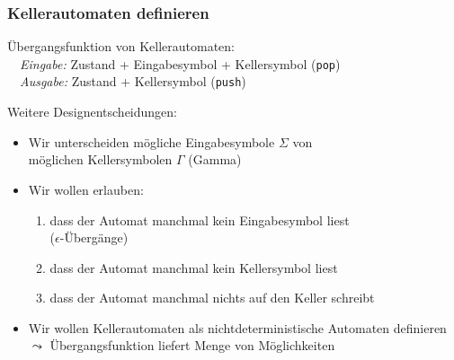\documentclass[aspectratio=1610,onlymath]{beamer}
\begin{document}
\begin{frame}\frametitle{Kellerautomaten definieren}

\alert{Übergangsfunktion von Kellerautomaten:}\\
~~\emph{Eingabe:} Zustand + Eingabesymbol + Kellersymbol (\texttt{pop})\\
~~\emph{Ausgabe:} Zustand + Kellersymbol (\texttt{push})
\bigskip\pause

\alert{Weitere Designentscheidungen:}
\begin{itemize}
\item Wir unterscheiden mögliche Eingabesymbole $\Sigma$ von\\möglichen Kellersymbolen $\Gamma$ (Gamma)\\
%
\pause
\item Wir wollen erlauben:
\begin{enumerate}[(1)]
\item dass der Automat manchmal kein Eingabesymbol liest\\
($\epsilon$-Übergänge)\pause
\item dass der Automat manchmal kein Kellersymbol liest
\pause
\item dass der Automat manchmal nichts auf den Keller schreibt
\pause
\end{enumerate}
%
\item Wir wollen Kellerautomaten als nichtdeterministische Automaten definieren\\
$\leadsto$ Übergangsfunktion liefert Menge von Möglichkeiten
\end{itemize}

\end{frame}
\end{document}
